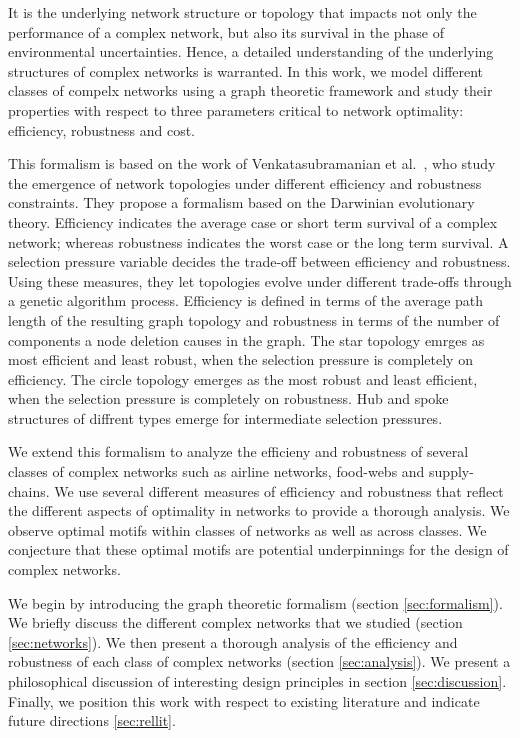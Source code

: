 \documentclass[a4paper,10pt]{article}
\begin{document}
It is the underlying network structure or topology that impacts not only the performance of a complex network, but also its survival in the phase of environmental uncertainties. Hence, a detailed understanding of the underlying structures of complex networks is warranted. In this work, we model different classes of compelx networks using a graph theoretic framework and study their properties with respect to three parameters critical to network optimality: efficiency, robustness and cost.

This formalism is based on the work of Venkatasubramanian et al.~\cite{venkat04}, who study the emergence of network topologies under different efficiency and robustness constraints. They propose a formalism based on the Darwinian evolutionary theory. Efficiency indicates the average case or short term survival of a complex network; whereas robustness indicates the worst case or the long term survival. A selection pressure variable decides the trade-off between efficiency and robustness. Using these measures, they let topologies evolve under different trade-offs through a genetic algorithm process. Efficiency is defined in terms of the average path length of the resulting graph topology and robustness in terms of the number of components a node deletion causes in the graph. The star topology emrges as most efficient and least robust, when the selection pressure is completely on efficiency. The circle topology emerges as the most robust and least efficient, when the selection pressure is completely on robustness. Hub and spoke structures of diffrent types emerge for intermediate selection pressures. 

We extend this formalism to analyze the efficieny and robustness of several classes of complex networks such as airline networks, food-webs and supply-chains. We use several different measures of efficiency and robustness that reflect the different aspects of optimality in networks to provide a thorough analysis. We observe optimal motifs within classes of networks as well as across classes. We conjecture that these optimal motifs are potential underpinnings for the design of complex networks.

We begin by introducing the graph theoretic formalism (section \ref{sec:formalism}). We briefly discuss the different complex networks that we studied (section \ref{sec:networks}). We then present a thorough analysis of the efficiency and robustness of each class of complex networks (section \ref{sec:analysis}). We present a philosophical discussion of interesting design principles in section \ref{sec:discussion}. Finally, we position this work with respect to existing literature and indicate future directions \ref{sec:rellit}.
\end{document}
